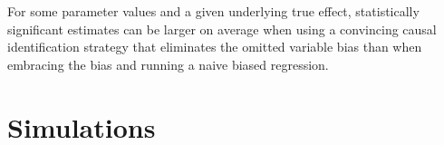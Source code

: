 \documentclass[usletter, 12pt]{article}
\begin{document}
			For some parameter values and a given underlying true effect, statistically significant estimates can be larger on average when using a convincing causal identification strategy that eliminates the omitted variable bias than when embracing the bias and running a naive biased regression.	
	


				
	\section{Simulations} \label{simulations}
		
    
\end{document}
